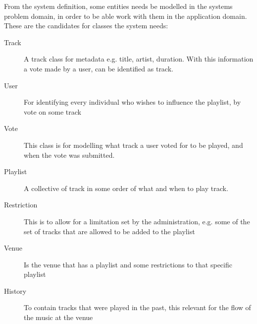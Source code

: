 From the system definition, some entities needs be modelled in the systems problem domain, in order to be able work with them in the application domain. These are the candidates for classes the system needs:
\begin{description}
    \item[Track]
    A track class for metadata e.g. title, artist, duration. With this information a vote made by a user, can be identified as track.
    \item[User]
    For identifying every individual who wishes to influence the playlist, by vote on some track
    \item[Vote]
    This class is for modelling what track a user voted for to be played, and when the vote was submitted.
    \item[Playlist]
    A collective of track in some order of what and when to play track.
    \item[Restriction]
    This is to allow for a limitation set by the administration, e.g. some of the set of tracks that are allowed to be added to the playlist
    \item[Venue]
    Is the venue that has a playlist and some restrictions to that specific playlist
    \item[History]
    To contain tracks that were played in the past, this relevant for the flow of the music at the venue
\end{description}
